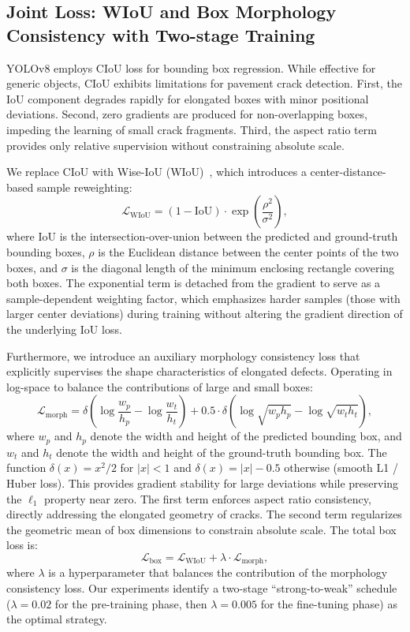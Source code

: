 \documentclass{ieeeaccess}
\begin{document}
\subsection{Joint Loss: WIoU and Box Morphology Consistency with Two-stage Training}

YOLOv8 employs CIoU loss for bounding box regression. While effective for generic objects, CIoU exhibits limitations for pavement crack detection. First, the IoU component degrades rapidly for elongated boxes with minor positional deviations. Second, zero gradients are produced for non-overlapping boxes, impeding the learning of small crack fragments. Third, the aspect ratio term provides only relative supervision without constraining absolute scale.

We replace CIoU with Wise-IoU (WIoU)~\cite{tong2024wiou, zhou2024wiouv3}, which introduces a center-distance-based sample reweighting:
\begin{equation}
\mathcal{L}_{\text{WIoU}} = (1 - \text{IoU}) \cdot \exp\left( \frac{\rho^2}{\sigma^2} \right),
\end{equation}
where $\text{IoU}$ is the intersection-over-union between the predicted and ground-truth bounding boxes, $\rho$ is the Euclidean distance between the center points of the two boxes, and $\sigma$ is the diagonal length of the minimum enclosing rectangle covering both boxes. The exponential term is detached from the gradient to serve as a sample-dependent weighting factor, which emphasizes harder samples (those with larger center deviations) during training without altering the gradient direction of the underlying IoU loss.

Furthermore, we introduce an auxiliary morphology consistency loss that explicitly supervises the shape characteristics of elongated defects. Operating in log-space to balance the contributions of large and small boxes:
\begin{equation}
\mathcal{L}_{\text{morph}} = \delta\!\left( \log\frac{w_p}{h_p} - \log\frac{w_t}{h_t} \right) + 0.5 \cdot \delta\!\left( \log\sqrt{w_p h_p} - \log\sqrt{w_t h_t} \right),
\end{equation}
where $w_p$ and $h_p$ denote the width and height of the predicted bounding box, and $w_t$ and $h_t$ denote the width and height of the ground-truth bounding box. The function $\delta(x) = x^2/2$ for $|x| < 1$ and $\delta(x) = |x| - 0.5$ otherwise (smooth L1 / Huber loss). This provides gradient stability for large deviations while preserving the $\ell_1$ property near zero. The first term enforces aspect ratio consistency, directly addressing the elongated geometry of cracks. The second term regularizes the geometric mean of box dimensions to constrain absolute scale. The total box loss is:
\begin{equation}
\mathcal{L}_{\text{box}} = \mathcal{L}_{\text{WIoU}} + \lambda \cdot \mathcal{L}_{\text{morph}},
\end{equation}
where $\lambda$ is a hyperparameter that balances the contribution of the morphology consistency loss. Our experiments identify a two-stage ``strong-to-weak'' schedule ($\lambda = 0.02$ for the pre-training phase, then $\lambda = 0.005$ for the fine-tuning phase) as the optimal strategy.
\end{document}
